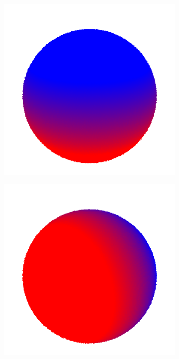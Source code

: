 \documentclass{article}
\begin{document}
\begin{figure}[!h]
\begin{subfigure}{.1\textwidth}
\end{subfigure}
\begin{subfigure}{.1\textwidth}
  \centering
  \includegraphics[width=\linewidth]{figs/spherical_harmonics/harmonics_2.png}  
\end{subfigure}
\begin{subfigure}{.1\textwidth}
  \centering
  \includegraphics[width=\linewidth]{figs/spherical_harmonics/harmonics_3.png}  

\end{subfigure}
\end{figure}
\end{document}
